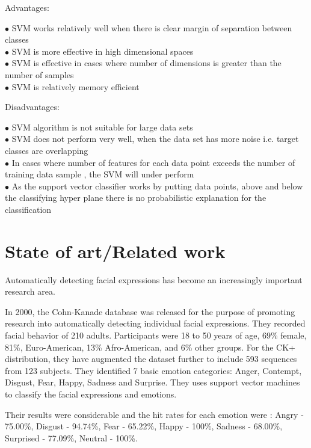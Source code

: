 \documentclass[runningheads,a4paper,11pt]{report}
\begin{document}
Advantages:
\begin{itemize}
	 {\color{blue}$\bullet$} SVM works relatively well when there is clear margin of separation between classes\\
	{\color{blue}$\bullet$} SVM is more effective in high dimensional spaces\\
	{\color{blue}$\bullet$} SVM is effective in cases where number of dimensions is greater than the number of samples\\
	 {\color{blue}$\bullet$} SVM is relatively memory efficient\\
\end{itemize}
Disadvantages:
\begin{itemize}
 {\color{red}$\bullet$} SVM algorithm is not suitable for large data sets \\
 {\color{red}$\bullet$} SVM does not perform very well, when the data set has more noise i.e. target classes are overlapping \\
 {\color{red}$\bullet$} In cases where number of features for each data point exceeds the number of training data sample , the SVM will under perform \\
 {\color{red}$\bullet$} As the support vector classifier works by putting data points, above and below the classifying hyper plane there is no probabilistic explanation for the classification \\
\end{itemize}  

\chapter{State of art/Related work}
\label{chapter:stateOfArt}

Automatically detecting facial expressions has become an increasingly important research area.

In 2000, the Cohn-Kanade database was released for the purpose of promoting research into automatically detecting individual facial expressions. \cite{Lucey10}
They recorded facial behavior of 210 adults. Participants were 18 to 50 years of age, 69\% female, 81\%, Euro-American, 13\% Afro-American, and 6\% other groups. For the CK+ distribution, they have augmented the dataset further to include 593 sequences from 123 subjects.
They identified 7 basic emotion categories: Anger, Contempt, Disgust, Fear, Happy, Sadness and Surprise.
They uses support vector machines to classify the facial expressions and emotions.

Their results were considerable and the hit rates for each emotion were : Angry - 75.00\%, Disgust - 94.74\%, Fear - 65.22\%, Happy - 100\%, Sadness - 68.00\%, Surprised - 77.09\%, Neutral - 100\%. \cite{Lucey10}
\end{document}
